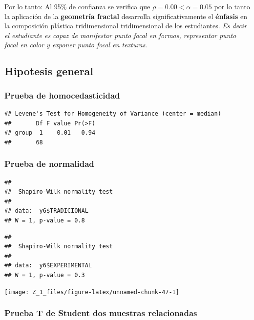 \documentclass[12pt,]{report}
\begin{document}
Por lo tanto: Al 95\% de confianza se verifica que \(\rho=0.00<\alpha=0.05\) por lo tanto la aplicación de la
\textbf{geometría fractal} desarrolla significativamente el \textbf{énfasis} en la composición plástica tridimensional
tridimensional de los estudiantes. \emph{Es decir el estudiante es capaz de manifestar punto
focal en formas, representar punto focal en color y exponer punto focal en texturas}.

\hypertarget{hipotesis-general}{%
\subsection{Hipotesis general}\label{hipotesis-general}}

\hypertarget{prueba-de-homocedasticidad-5}{%
\subsubsection{Prueba de homocedasticidad}\label{prueba-de-homocedasticidad-5}}

\begin{verbatim}
## Levene's Test for Homogeneity of Variance (center = median)
##       Df F value Pr(>F)
## group  1    0.01   0.94
##       68
\end{verbatim}

\hypertarget{prueba-de-normalidad-5}{%
\subsubsection{Prueba de normalidad}\label{prueba-de-normalidad-5}}

\begin{verbatim}
## 
##  Shapiro-Wilk normality test
## 
## data:  y6$TRADICIONAL
## W = 1, p-value = 0.8
\end{verbatim}

\begin{verbatim}
## 
##  Shapiro-Wilk normality test
## 
## data:  y6$EXPERIMENTAL
## W = 1, p-value = 0.3
\end{verbatim}

\begin{center}\texttt{[image: Z\_1\_files/figure-latex/unnamed-chunk-47-1]} \end{center}

\hypertarget{prueba-t-de-student-dos-muestras-relacionadas-5}{%
\subsubsection{Prueba T de Student dos muestras relacionadas}\label{prueba-t-de-student-dos-muestras-relacionadas-5}}
\end{document}
